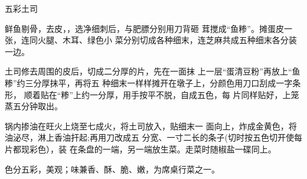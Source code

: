 \begin{recipe}{五彩土司}

\ingredients



\cooking

\step 鲜鱼剔骨，去皮，，选净细刺后，与肥膘分别用刀背砸 茸搅成“鱼糁”。摊蛋皮一张，连同火腿、木耳、绿色小 菜分别切成各种细末，连芝麻共成五种细末各分装一边。

\step 土司修去周围的皮后，切成二分厚的片，先在一面抹 上一层“蛋清豆粉”再放上“鱼糁”约三分厚抹平，再将五 种细末一样样摊开在墩子上，分颜色用刀口刮成一字条形， 顺着贴在“糁”上约一分厚，用手按平不脱，自成五色，每 片同样贴好，上笼蒸五分钟取出。

\step 锅内掺油在旺火上烧至七成火，将土司放入，贴细末一 面向上，炸成金黄色，将油泌尽，淋上香油扞起;再用刀改成五 分宽、一寸二长的条子(切时按五色切开使每片都现彩色），装 在条盘的一端，另一端放生菜。走菜时随椒盐一碟同上。

\notes

色分五彩，美观；味兼香、酥、脆、嫩，为席桌行菜之一。

\end{recipe}

